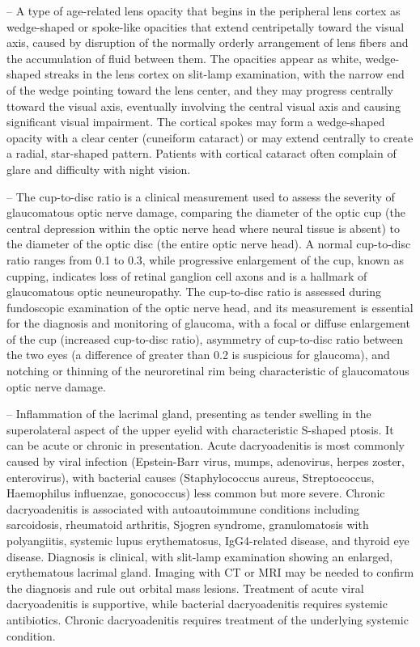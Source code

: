-- A type of age-related lens opacity that begins in the peripheral lens cortex as wedge-shaped or spoke-like opacities that extend centripetally toward the visual axis, caused by disruption of the normally orderly arrangement of lens fibers and the accumulation of fluid between them. The opacities appear as white, wedge-shaped streaks in the lens cortex on slit-lamp examination, with the narrow end of the wedge pointing toward the lens center, and they may progress centrally ttoward the visual axis, eventually involving the central visual axis and causing significant visual impairment. The cortical spokes may form a wedge-shaped opacity with a clear center (cuneiform cataract) or may extend centrally to create a radial, star-shaped pattern. Patients with cortical cataract often complain of glare and difficulty with night vision.

-- The cup-to-disc ratio is a clinical measurement used to assess the severity of glaucomatous optic nerve damage, comparing the diameter of the optic cup (the central depression within the optic nerve head where neural tissue is absent) to the diameter of the optic disc (the entire optic nerve head). A normal cup-to-disc ratio ranges from 0.1 to 0.3, while progressive enlargement of the cup, known as cupping, indicates loss of retinal ganglion cell axons and is a hallmark of glaucomatous optic neuneuropathy. The cup-to-disc ratio is assessed during fundoscopic examination of the optic nerve head, and its measurement is essential for the diagnosis and monitoring of glaucoma, with a focal or diffuse enlargement of the cup (increased cup-to-disc ratio), asymmetry of cup-to-disc ratio between the two eyes (a difference of greater than 0.2 is suspicious for glaucoma), and notching or thinning of the neuroretinal rim being characteristic of glaucomatous optic nerve damage.

-- Inflammation of the lacrimal gland, presenting as tender swelling in the superolateral aspect of the upper eyelid with characteristic S-shaped ptosis. It can be acute or chronic in presentation. Acute dacryoadenitis is most commonly caused by viral infection (Epstein-Barr virus, mumps, adenovirus, herpes zoster, enterovirus), with bacterial causes (Staphylococcus aureus, Streptococcus, Haemophilus influenzae, gonococcus) less common but more severe. Chronic dacryoadenitis is associated with autoautoimmune conditions including sarcoidosis, rheumatoid arthritis, Sjogren syndrome, granulomatosis with polyangiitis, systemic lupus erythematosus, IgG4-related disease, and thyroid eye disease. Diagnosis is clinical, with slit-lamp examination showing an enlarged, erythematous lacrimal gland. Imaging with CT or MRI may be needed to confirm the diagnosis and rule out orbital mass lesions. Treatment of acute viral dacryoadenitis is supportive, while bacterial dacryoadenitis requires systemic antibiotics. Chronic dacryoadenitis requires treatment of the underlying systemic condition.

